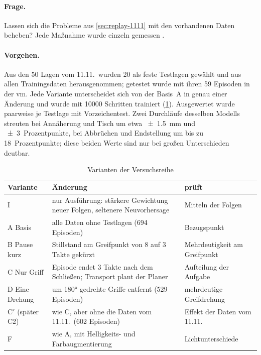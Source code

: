 \paragraph{Frage.} Lassen sich die Probleme aus \cref{sec:replay-1111} mit den vorhandenen
Daten beheben? Jede Maßnahme wurde einzeln gemessen
.

\paragraph{Vorgehen.} Aus den 50 Lagen vom 11.11.\ wurden 20 als feste Testlagen gewählt und
aus allen Trainingsdaten herausgenommen; getestet wurde mit ihren 59 Episoden in der \ac{vm}.
Jede Variante unterscheidet sich von der Basis~A in genau einer Änderung und wurde mit
\num{10000} Schritten trainiert (\cref{tab:varianten-def}). Ausgewertet wurde paarweise je
Testlage mit Vorzeichentest. Zwei Durchläufe desselben Modells streuten bei Annäherung und
Tisch um etwa \SI{\pm 1.5}{\milli\metre} und \SI{\pm 3}{Prozentpunkte}, bei Abbrüchen und
Endstellung um bis zu \SI{18}{Prozentpunkte}; diese beiden Werte sind nur bei großen
Unterschieden deutbar.

\begin{table}[htbp]
  \centering
  \caption{Varianten der Versuchsreihe}
  \label{tab:varianten-def}
  \small
  \begin{tabularx}{\textwidth}{@{}l X X@{}}
    \toprule
    Variante & Änderung & prüft \\
    \midrule
    I & nur Ausführung: stärkere Gewichtung neuer Folgen, seltenere Neuvorhersage & Mitteln der
      Folgen \\
    A Basis & alle Daten ohne Testlagen (694 Episoden) & Bezugspunkt \\
    B Pause kurz & Stillstand am Greifpunkt von 8 auf 3 Takte gekürzt & Mehrdeutigkeit am
      Greifpunkt \\
    C Nur Griff & Episode endet 3 Takte nach dem Schließen; Transport plant der Planer &
      Aufteilung der Aufgabe \\
    D Eine Drehung & um \ang{180} gedrehte Griffe entfernt (529 Episoden) & mehrdeutige
      Greifdrehung \\
    C$'$ (später C2) & wie C, aber ohne die Daten vom 11.11.\ (602 Episoden) & Effekt der
      Daten vom 11.11. \\
    F & wie A, mit Helligkeits- und Farbaugmentierung & Lichtunterschiede \\
    \bottomrule
  \end{tabularx}
\end{table}


